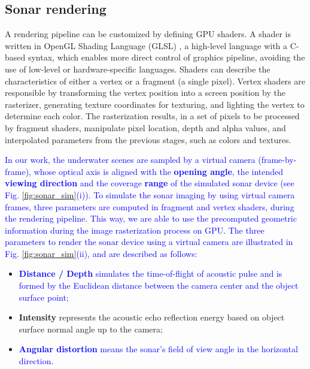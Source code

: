 \documentclass[final,5p,times]{elsarticle}
\begin{document}
\subsection{Sonar rendering}
\label{dev:shader}

A rendering pipeline can be customized by defining GPU shaders. A shader is written in OpenGL Shading Language (GLSL) \cite{rost2009}, a high-level language with a C-based syntax, which enables more direct control of graphics pipeline, avoiding the use of low-level or hardware-specific languages. Shaders can describe the characteristics of either a vertex or a fragment (a single pixel). Vertex shaders are responsible by transforming the vertex position into a screen position by the rasterizer, generating texture coordinates for texturing, and lighting the vertex to determine each color. The rasterization results, in a set of pixels to be processed by fragment shaders, manipulate pixel location, depth and alpha values, and interpolated parameters from the previous stages, such as colors and textures.

\textcolor{blue}{In our work, the underwater scenes are sampled by a virtual camera (frame-by-frame), whose optical axis is aligned with the \textbf{opening angle}, the intended \textbf{viewing direction} and the coverage \textbf{range} of the simulated sonar device (see Fig. \ref{fig:sonar_sim}(i)). To simulate the sonar imaging by using virtual camera frames, three parameters are computed in fragment and vertex shaders, during the rendering pipeline. This way, we are able to use the precomputed geometric information during the image rasterization process on GPU. The three parameters to render the sonar device using a virtual camera are illustrated in Fig. \ref{fig:sonar_sim}(ii), and are described as follows:}

\begin{itemize}[]
    \item \textcolor{blue}{\textbf{Distance / Depth} simulates the time-of-flight of acoustic pulse and is formed by the Euclidean distance between the camera center and the object surface point;}
    \item \textbf{Intensity} represents the acoustic echo reflection energy based on object surface normal angle up to the camera;
    \item \textcolor{blue}{\textbf{Angular distortion} means the sonar's field of view angle in the horizontal direction.}
\end{itemize}
\end{document}
